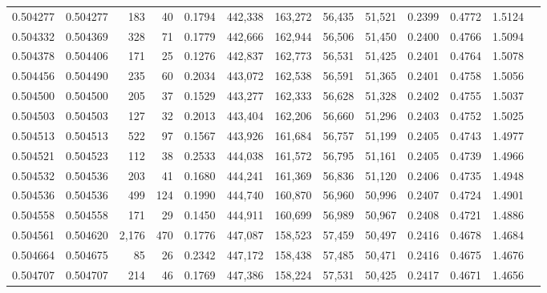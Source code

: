 \begin{tabular}{rrrrrrrrrrrrr}
0.504277 & 0.504277 &   183 &    40 &                                     0.1794 & 442,338 & 163,272 &  56,435 &  51,521 & 0.2399 & 0.4772 & 1.5124 \\
0.504332 & 0.504369 &   328 &    71 &                                     0.1779 & 442,666 & 162,944 &  56,506 &  51,450 & 0.2400 & 0.4766 & 1.5094 \\
0.504378 & 0.504406 &   171 &    25 &                                     0.1276 & 442,837 & 162,773 &  56,531 &  51,425 & 0.2401 & 0.4764 & 1.5078 \\
0.504456 & 0.504490 &   235 &    60 &                                     0.2034 & 443,072 & 162,538 &  56,591 &  51,365 & 0.2401 & 0.4758 & 1.5056 \\
0.504500 & 0.504500 &   205 &    37 &                                     0.1529 & 443,277 & 162,333 &  56,628 &  51,328 & 0.2402 & 0.4755 & 1.5037 \\
0.504503 & 0.504503 &   127 &    32 &                                     0.2013 & 443,404 & 162,206 &  56,660 &  51,296 & 0.2403 & 0.4752 & 1.5025 \\
0.504513 & 0.504513 &   522 &    97 &                                     0.1567 & 443,926 & 161,684 &  56,757 &  51,199 & 0.2405 & 0.4743 & 1.4977 \\
0.504521 & 0.504523 &   112 &    38 &                                     0.2533 & 444,038 & 161,572 &  56,795 &  51,161 & 0.2405 & 0.4739 & 1.4966 \\
0.504532 & 0.504536 &   203 &    41 &                                     0.1680 & 444,241 & 161,369 &  56,836 &  51,120 & 0.2406 & 0.4735 & 1.4948 \\
0.504536 & 0.504536 &   499 &   124 &                                     0.1990 & 444,740 & 160,870 &  56,960 &  50,996 & 0.2407 & 0.4724 & 1.4901 \\
0.504558 & 0.504558 &   171 &    29 &                                     0.1450 & 444,911 & 160,699 &  56,989 &  50,967 & 0.2408 & 0.4721 & 1.4886 \\
0.504561 & 0.504620 & 2,176 &   470 &                                     0.1776 & 447,087 & 158,523 &  57,459 &  50,497 & 0.2416 & 0.4678 & 1.4684 \\
0.504664 & 0.504675 &    85 &    26 &                                     0.2342 & 447,172 & 158,438 &  57,485 &  50,471 & 0.2416 & 0.4675 & 1.4676 \\
0.504707 & 0.504707 &   214 &    46 &                                     0.1769 & 447,386 & 158,224 &  57,531 &  50,425 & 0.2417 & 0.4671 & 1.4656 \\

\end{tabular}

